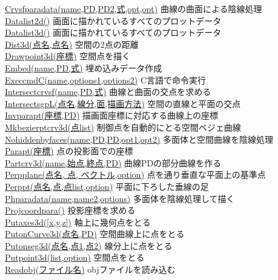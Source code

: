 \documentclass[papersize,a4paper,12pt,uplatex]{jsarticle}
\begin{document}
\begin{tabbing}
\hyperlink{crvsfparadata}{Crvsfparadata(name,PD,PD2,式,opt,opt)}  \>曲線の曲面による陰線処理\\
\hyperlink{datalist}{Datalist2d()}  \>画面に描かれているすべてのプロットデータ\\
\hyperlink{datalist}{Datalist3d()}  \>画面に描かれているすべてのプロットデータ\\
\hyperlink{dist3d}{Dist3d(点名,点名)}  \>空間の2点の距離\\
\hyperlink{drawpoint3d}{Drawpoint3d(座標)}  \>空間点を描く\\
\hyperlink{embed}{Embed(name,PD,式)}  \>埋め込みデータ作成\\
\hyperlink{execcmdc}{ExeccmdC(name,options1,options2)}  \>C言語で命令実行\\
\hyperlink{intersectcrvsf}{Intersectcrvsf(name,PD,式)}  \>曲線と曲面の交点を求める\\
\hyperlink{intersectsgpL}{IntersectsgpL(点名,線分,面,描画方法)}  \>空間の直線と平面の交点\\
\hyperlink{invparapt}{Invparapt(座標,PD)}  \>描画面座標に対応する曲線上の座標\\
\hyperlink{mkbezierptcrv3d}{Mkbezierptcrv3d(点list)}  \>制御点を自動的にとる空間ベジェ曲線\\
\hyperlink{nohiddenbyfaces}{Nohiddenbyfaces(name,PD,PD,opt1,opt2)}  \>多面体と空間曲線を陰線処理\\
\hyperlink{parapt}{Parapt(座標)}  \>点の投影面での座標\\
\hyperlink{partcrv3d}{Partcrv3d(name,始点,終点,PD)}  \>曲線PDの部分曲線を作る\\
\hyperlink{perpplane}{Perpplane(点名, 点, ベクトル,option)}  \>点を通り垂直な平面上の基準点\\
\hyperlink{perppt}{Perppt(点名,点,点list,option)}  \>平面に下ろした垂線の足\\
\hyperlink{phparadata}{Phparadata(name,name2,options)}  \>多面体を陰線処理して描く\\
\hyperlink{projcoordpara}{Projcoordpara()}  \>投影座標を求める\\
\hyperlink{putaxes3d}{Putaxes3d([x,y,z])}  \>軸上に幾何点をとる\\
\hyperlink{putonCurve3d}{PutonCurve3d(点名,PD)}  \>空間曲線上に点をとる\\
\hyperlink{putonseg3d}{Putonseg3d(点名,点1,点2)}  \>線分上に点をとる\\
\hyperlink{putpoint3d}{Putpoint3d(list,option)}  \>空間点をとる\\
\hyperlink{readobj}{Readobj(ファイル名)}  \>objファイルを読み込む\\

\end{tabbing}
\end{document}
